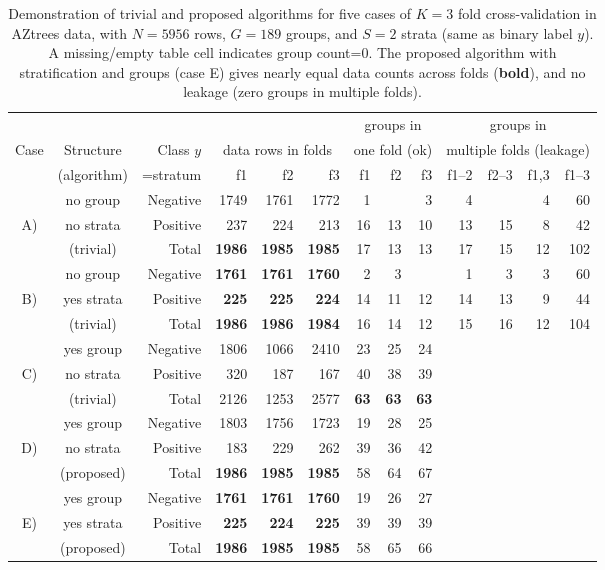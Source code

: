 \documentclass[twoside]{article}
\begin{document}
\begin{table}[t]
  \centering
\begin{tabular}{|cc|r|rrr|rrr|rrrr|}
  \hline
&&  & &&& \multicolumn{3}{c|}{groups in} & \multicolumn{4}{c|}{groups in} \\
Case &Structure& Class $y$ &\multicolumn{3}{c|}{data rows in folds} & \multicolumn{3}{c|}{one fold (ok)} & \multicolumn{4}{c|}{multiple folds (leakage)} \\
&(algorithm)& =stratum & f1 & f2 & f3 & f1 & f2 & f3 & f1–2 & f2–3 & f1,3 & f1–3 \\ 
  \hline
&no group&Negative & 1749 & 1761 & 1772 &   1 &    &   3 &   4 &    &   4 &  60 \\ 
A) &no strata&Positive &  237 & 224 & 213 &  16 &  13 &  10 &  13 &  15 &   8 &  42 \\ 
&(trivial)&Total &  \textbf{1986} & \textbf{1985} & \textbf{1985} &  17 &  13 &  13 &  17 &  15 &  12 & 102 \\ 
  \hline
&no group&Negative &  \textbf{1761} & \textbf{1761} & \textbf{1760} &   2 &   3 &    &   1 &   3 &   3 &  60 \\ 
B)&yes strata&Positive &  \textbf{225} & \textbf{225} & \textbf{224} &  14 &  11 &  12 &  14 &  13 &   9 &  44 \\ 
&(trivial)&Total &  \textbf{1986} & \textbf{1986} & \textbf{1984} &  16 &  14 &  12 &  15 &  16 &  12 & 104 \\ 
  \hline
&yes group&Negative &  1806 & 1066 & 2410 &  23 &  25 &  24 &  &  &  &  \\ 
C)&no strata&Positive &  320 & 187 & 167 &  40 &  38 &  39 &  &  &  &  \\ 
&(trivial)&Total &  2126 & 1253 & 2577 &  \textbf{63} &  \textbf{63} &  \textbf{63} &  &  &  &  \\ 
  \hline
&yes group&Negative &  1803 & 1756 & 1723 &  19 &  28 &  25 &  &  &  &  \\ 
D)&no strata&Positive &  183 & 229 & 262 &  39 &  36 &  42 &  &  &  &  \\ 
&(proposed)&Total &  \textbf{1986} & \textbf{1985} & \textbf{1985} &  58 &  64 &  67 &  &  &  &  \\ 
  \hline
&yes group&Negative &  \textbf{1761} & \textbf{1761} & \textbf{1760} &  19 &  26 &  27 &  &  &  &  \\ 
E)&yes strata&Positive &  \textbf{225} & \textbf{224} & \textbf{225} &  39 &  39 &  39 &  &  &  &  \\ 
&(proposed)&Total &  \textbf{1986} & \textbf{1985} & \textbf{1985} &  58 &  65 &  66 &  &  &  &  \\ 
   \hline
\end{tabular}
\caption{
  \label{tab:counts}
  Demonstration of trivial and proposed algorithms for five cases of $K=3$ fold cross-validation in AZtrees data, with $N=5956$ rows, $G=189$ groups, and $S=2$ strata (same as binary label $y$).
  A missing/empty table cell indicates group count=0.
  The proposed algorithm with stratification and groups (case E) gives nearly equal data counts across folds (\textbf{bold}), and no leakage (zero groups in multiple folds).
}
\end{table}
\end{document}
